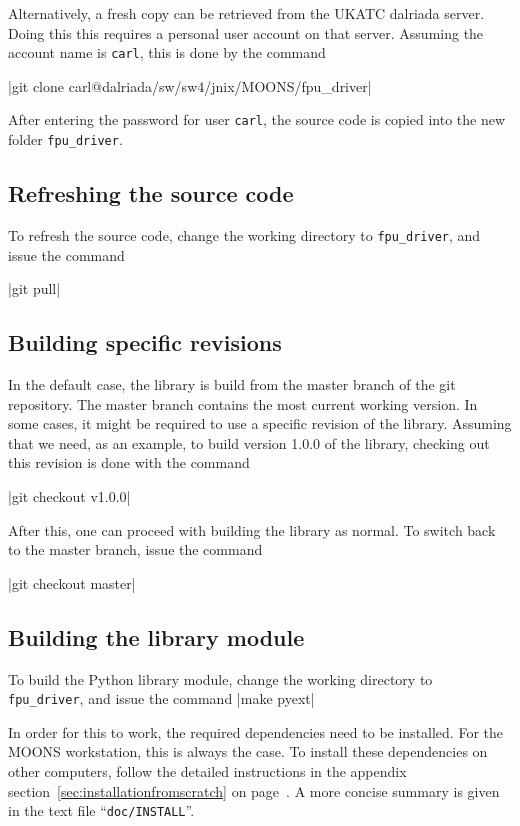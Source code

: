 \documentclass[11pt,a4paper]{scrartcl}
\begin{document}
Alternatively, a fresh copy can be retrieved from the UKATC dalriada
server. Doing this this requires a personal user account on that
server. Assuming the account name is \texttt{carl}, this is done by
the command

|git clone carl@dalriada/sw/sw4/jnix/MOONS/fpu_driver|

After entering the password for user \texttt{carl}, the
source code is copied into the new folder \texttt{fpu\_driver}.

\subsection{Refreshing the source code}
To refresh the source code, change the
working directory to \texttt{fpu\_driver},
and issue the command

|git pull|


\subsection{Building specific revisions}
In the default case, the library is build from
the master branch of the git repository.
The master branch contains the most current
working version.
In some cases, it might be required to
use a specific revision of the library.
Assuming that we need, as an example,
to build version 1.0.0 of the library,
checking out this revision is done with the
command

|git checkout v1.0.0|

After this, one can proceed with building the library as normal. To
switch back to the master branch, issue the command

|git checkout master|


\subsection{Building the library module}
To build the Python library module,
change the working directory to \texttt{fpu\_driver},
and issue the command |make pyext|

In order for this to work, the required dependencies need to be
installed. For the MOONS workstation, this is always the case. To
install these dependencies on other computers, follow the detailed
instructions in the appendix section~\ref{sec:installationfromscratch}
on page~\pageref{sec:installationfromscratch}.  A more concise summary
is given in the text file ``\texttt{doc/INSTALL}''.
\end{document}
